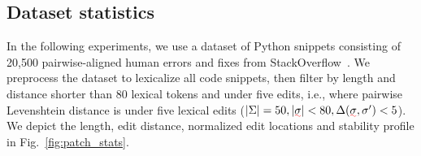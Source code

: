 \documentclass[sigplan,acmsmall,nonacm,screen]{acmart}\settopmatter{printfolios=false,printccs=false,printacmref=false}
\begin{document}
  \subsection{Dataset statistics}\label{sec:rq1}

  In the following experiments, we use a dataset of Python snippets consisting of 20,500 pairwise-aligned human errors and fixes from StackOverflow~\cite{wong2019syntax}. We preprocess the dataset to lexicalize all code snippets, then filter by length and distance shorter than 80 lexical tokens and under five edits, i.e., where pairwise Levenshtein distance is under five lexical edits ($|\Sigma| = 50, |\err{\sigma}| < 80, \Delta(\err{\sigma}, \sigma') < 5$). We depict the length, edit distance, normalized edit locations and stability profile in Fig.~\ref{fig:patch_stats}.
\end{document}
